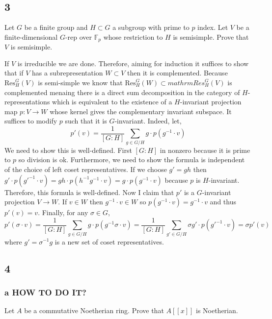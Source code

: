 \documentclass[12pt]{article}
\begin{document}
\subsection{3}

\begin{exercise}
Let $G$ be a finite group and $H \subset G$ a subgroup with prime to $p$ index. Let $V$ be a finite-dimensional $G$-rep over $\mathbb{F}_p$ whose restriction to $H$ is semisimple. Prove that $V$ is semisimple.
\end{exercise}

If $V$ is irreducible we are done. Therefore, aiming for induction it suffices to show that if $V$ has a subrepresentation $W \subset V$ then it is complemented. Because $\mathrm{Res}^G_H(V)$ is semi-simple we know that $\mathrm{Res}^G_H(W) \subset mathrm{Res}^G_H(V)$ is complemented menaing there is a direct sum decomposition in the category of $H$-representations which is equivalent to the existence of a $H$-invariant projection map $p : V \to W$ whose kernel gives the complementary invariant subspace. It suffices to modify $p$ such that it is $G$-invariant. Indeed, let,
\[ p'(v) = \frac{1}{[G : H]} \sum_{g \in G / H} g \cdot p(g^{-1} \cdot v) \]
We need to show this is well-defined. First $[G : H]$ in nonzero because it is prime to $p$ so division is ok. Furthermore, we need to show the formula is independent of the choice of left coset representatives. If we choose $g' = g h$ then $g' \cdot p(g'^{-1} \cdot v) = g h \cdot p(h^{-1} g^{-1} \cdot v) = g \cdot p(g^{-1} \cdot v)$ because $p$ is $H$-invariant. Therefore, this formula is well-defined. Now I claim that $p'$ is a $G$-invariant projection $V \to W$. If $v \in W$ then $g^{-1} \cdot v \in W$ so $p(g^{-1} \cdot v) = g^{-1} \cdot v$ and thus $p'(v) = v$. Finally, for any $\sigma \in G$,
\[ p'(\sigma \cdot v) = \frac{1}{[G : H]} \sum_{g \in G / H} g \cdot p(g^{-1} \sigma \cdot v) = \frac{1}{[G : H]} \sum_{g' \in G / H} \sigma g' \cdot p(g'^{-1} \cdot v) = \sigma p'(v) \]
where $g' = \sigma^{-1} g$ is a new set of coset representatives.

\subsection{4}

\subsubsection{a HOW TO DO IT?}

\begin{exercise}
Let $A$ be a commutative Noetherian ring. Prove that $A[[x]]$ is Noetherian. 
\end{exercise}
\end{document}
